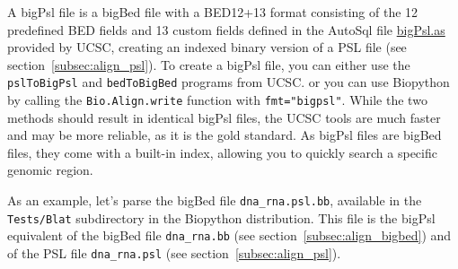 A bigPsl file is a bigBed file with a BED12+13 format consisting of the 12
predefined BED fields and 13 custom fields defined in the AutoSql file
\href{https://genome.ucsc.edu/goldenPath/help/bigPsl.html}{bigPsl.as} provided by UCSC, creating an indexed binary version of a PSL file (see section~\ref{subsec:align_psl}). To create a bigPsl file, you can either use the \verb+pslToBigPsl+ and \verb+bedToBigBed+ programs from UCSC. or you can use Biopython by calling the \verb|Bio.Align.write| function with \verb|fmt="bigpsl"|. While the two methods should result in identical bigPsl files, the UCSC tools are much faster and may be more reliable, as it is the gold standard. As bigPsl files are bigBed files, they come with a built-in index, allowing you to quickly search a specific genomic region.

As an example, let's parse the bigBed file \verb|dna_rna.psl.bb|, available in the \verb|Tests/Blat| subdirectory in the Biopython distribution. This file is the bigPsl equivalent of the bigBed file \verb|dna_rna.bb| (see section~\ref{subsec:align_bigbed}) and of the PSL file \verb|dna_rna.psl| (see section~\ref{subsec:align_psl}).
